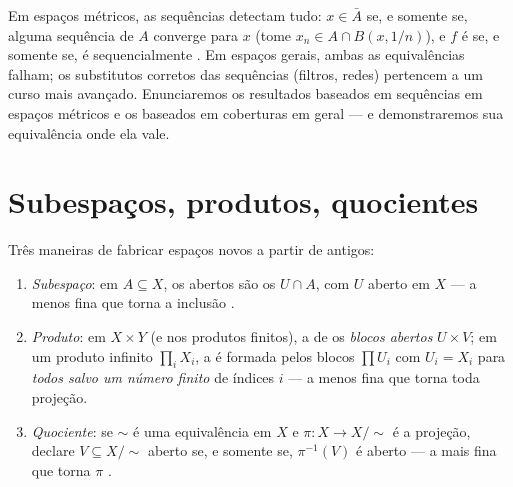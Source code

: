 \begin{remark}\label{rem:b3:topology:sequences}
Em espaços métricos, as sequências detectam tudo: $x \in \bar A$ se, e somente
se, alguma sequência de $A$ converge para $x$ (tome $x_n \in A \cap
B(x, 1/n)$), e
$f$ é  se, e somente se, é sequencialmente . Em
espaços gerais, ambas as equivalências falham; os substitutos corretos
das sequências (filtros, redes) pertencem a um curso mais avançado.
Enunciaremos os resultados baseados em sequências em espaços métricos e
os baseados em coberturas em geral --- e demonstraremos sua
equivalência onde ela vale.
\end{remark}

\section{Subespaços, produtos, quocientes}

\begin{definition}\label{def:b3:topology:constructions}
Três maneiras de fabricar espaços novos a partir de antigos:
\begin{enumerate}
  \item \emph{Subespaço}: em $A \subseteq X$, os abertos são os $U \cap A$, com $U$
        aberto em $X$ --- a  menos fina que torna a
        inclusão .
  \item \emph{Produto}: em $X \times Y$ (e nos produtos finitos), a 
        de  os \emph{blocos abertos} $U \times
        V$; em um produto infinito
        $\prod_i X_i$, a  é formada pelos blocos $\prod U_i$ com $U_i = X_i$ para
        \emph{todos salvo um número finito} de índices $i$ --- a
         menos fina que torna  toda projeção.
  \item \emph{Quociente}: se $\sim$ é uma equivalência em $X$ e
        $\pi\colon X \to X/{\sim}$ é a projeção, declare $V
        \subseteq X/{\sim}$ aberto se, e somente se,
        $\pi^{-1}(V)$ é aberto --- a  mais fina que torna $\pi$
        .
\end{enumerate}
\end{definition}


